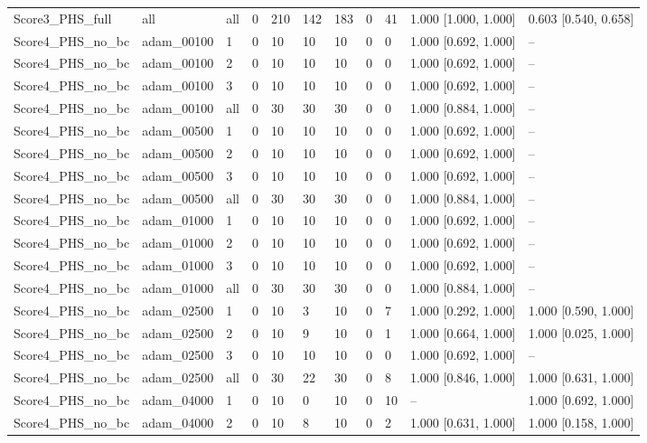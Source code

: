 \begin{longtable}{lllllllllll}
Score3\_PHS\_full & all & all & 0 & 210 & 142 & 183 & 0 & 41 & 1.000 [1.000, 1.000] & 0.603 [0.540, 0.658] \\
Score4\_PHS\_no\_bc & adam\_00100 & 1 & 0 & 10 & 10 & 10 & 0 & 0 & 1.000 [0.692, 1.000] & -- \\
Score4\_PHS\_no\_bc & adam\_00100 & 2 & 0 & 10 & 10 & 10 & 0 & 0 & 1.000 [0.692, 1.000] & -- \\
Score4\_PHS\_no\_bc & adam\_00100 & 3 & 0 & 10 & 10 & 10 & 0 & 0 & 1.000 [0.692, 1.000] & -- \\
Score4\_PHS\_no\_bc & adam\_00100 & all & 0 & 30 & 30 & 30 & 0 & 0 & 1.000 [0.884, 1.000] & -- \\
Score4\_PHS\_no\_bc & adam\_00500 & 1 & 0 & 10 & 10 & 10 & 0 & 0 & 1.000 [0.692, 1.000] & -- \\
Score4\_PHS\_no\_bc & adam\_00500 & 2 & 0 & 10 & 10 & 10 & 0 & 0 & 1.000 [0.692, 1.000] & -- \\
Score4\_PHS\_no\_bc & adam\_00500 & 3 & 0 & 10 & 10 & 10 & 0 & 0 & 1.000 [0.692, 1.000] & -- \\
Score4\_PHS\_no\_bc & adam\_00500 & all & 0 & 30 & 30 & 30 & 0 & 0 & 1.000 [0.884, 1.000] & -- \\
Score4\_PHS\_no\_bc & adam\_01000 & 1 & 0 & 10 & 10 & 10 & 0 & 0 & 1.000 [0.692, 1.000] & -- \\
Score4\_PHS\_no\_bc & adam\_01000 & 2 & 0 & 10 & 10 & 10 & 0 & 0 & 1.000 [0.692, 1.000] & -- \\
Score4\_PHS\_no\_bc & adam\_01000 & 3 & 0 & 10 & 10 & 10 & 0 & 0 & 1.000 [0.692, 1.000] & -- \\
Score4\_PHS\_no\_bc & adam\_01000 & all & 0 & 30 & 30 & 30 & 0 & 0 & 1.000 [0.884, 1.000] & -- \\
Score4\_PHS\_no\_bc & adam\_02500 & 1 & 0 & 10 & 3 & 10 & 0 & 7 & 1.000 [0.292, 1.000] & 1.000 [0.590, 1.000] \\
Score4\_PHS\_no\_bc & adam\_02500 & 2 & 0 & 10 & 9 & 10 & 0 & 1 & 1.000 [0.664, 1.000] & 1.000 [0.025, 1.000] \\
Score4\_PHS\_no\_bc & adam\_02500 & 3 & 0 & 10 & 10 & 10 & 0 & 0 & 1.000 [0.692, 1.000] & -- \\
Score4\_PHS\_no\_bc & adam\_02500 & all & 0 & 30 & 22 & 30 & 0 & 8 & 1.000 [0.846, 1.000] & 1.000 [0.631, 1.000] \\
Score4\_PHS\_no\_bc & adam\_04000 & 1 & 0 & 10 & 0 & 10 & 0 & 10 & -- & 1.000 [0.692, 1.000] \\
Score4\_PHS\_no\_bc & adam\_04000 & 2 & 0 & 10 & 8 & 10 & 0 & 2 & 1.000 [0.631, 1.000] & 1.000 [0.158, 1.000] \\

\end{longtable}
